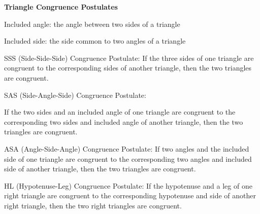 \begin{center}
\textbf{Triangle Congruence Postulates 
}
\end{center}

\vspce

Included angle: the angle between two sides of a triangle 

\vspce 

Included side: the side common to  two angles  of a triangle 


\vspce 

SSS (Side-Side-Side) Congruence Postulate: If the three sides of one triangle are congruent to the corresponding sides of another triangle, then the two triangles are congruent.

\vspce 

SAS (Side-Angle-Side) Congruence Postulate: 

If the two sides and an included angle of one triangle are congruent to the corresponding  two sides and included angle of another triangle, then the two triangles are congruent.

\vspce 

ASA (Angle-Side-Angle) Congruence Postulate: If two angles and the included side of one triangle are congruent to the corresponding two angles and included side of another triangle, then the two triangles are congruent. 

\vspce 

HL (Hypotenuse-Leg) Congruence Postulate: If the hypotenuse and a leg of one right triangle are congruent to the corresponding hypotenuse and side of another right triangle, then the two right triangles are congruent.



